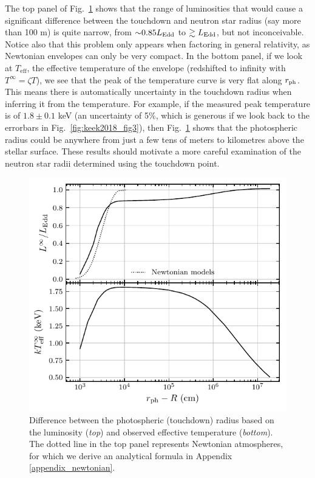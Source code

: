 \documentclass[../main.tex]{subfiles}
\begin{document}
The top panel of Fig.~\ref{fig:env_touchdown} shows that the range of luminosities that would cause a significant difference between the touchdown and neutron star radius (say more than 100 m) is quite narrow, from ${\sim}0.85L_\text{Edd}$ to $\gtrsim L_\text{Edd}$, but not inconceivable. Notice also that this problem only appears when factoring in general relativity, as Newtonian envelopes can only be very compact. In the bottom panel, if we look at $T_\text{eff}$, the effective temperature of the envelope (redshifted to infinity with $T^\infty=\zeta T$), we see that the peak of the temperature curve is very flat along $r_\text{ph}$. This means there is automatically uncertainty in the touchdown radius when inferring it from the temperature. For example, if the measured peak temperature is of $1.8\pm 0.1$ keV (an uncertainty of 5\%, which is generous if we look back to the errorbars in Fig.~\ref{fig:keek2018_fig3}), then Fig.~\ref{fig:env_touchdown} shows that the photospheric radius could be anywhere from just a few tens of meters to kilometres above the stellar surface. These results should motivate a more careful examination of the neutron star radii determined using the touchdown point.



\begin{figure}
    \centering
    \includegraphics{figures/env_touchdown.pdf}
    \caption[Touchdown radius based on the observables]{Difference between the photospheric (touchdown) radius based on the luminosity (\textit{top}) and observed effective temperature (\textit{bottom}). The dotted line in the top panel represents Newtonian atmospheres, for which we derive an analytical formula in Appendix \ref{appendix_newtonian}.}
    \label{fig:env_touchdown}
\end{figure}



\biblio
\end{document}

